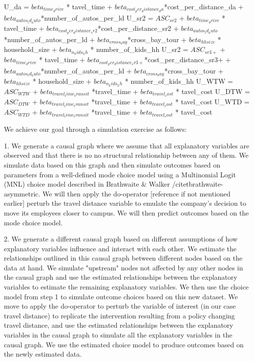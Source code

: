 U_da = $beta_{time_drive}$ * tavel_time + $beta_{cost_per_distance_da}$*cost_per_distance_da + $beta_{autos_ld_auto}$*number_of_autos_per_ld
U_sr2 = $ASC_{sr2}$ + $beta_{time_drive}$ * tavel_time + $beta_{cost_per_distance_sr2}$*cost_per_distance_sr2 + $beta_{autos_ld_auto}$*number_of_autos_per_ld + $beta_{cross_bay}$*cross_bay_tour + $beta_{hhsize}$ * household_size + $beta_{n_kids_hh}$ * number_of_kids_hh
U_sr2 = $ASC_{sr3+}$ + $beta_{time_drive}$ * tavel_time + $beta_{cost_per_distance_sr3+}$*cost_per_distance_sr3+ + $beta_{autos_ld_auto}$*number_of_autos_per_ld + $beta_{cross_bay}$*cross_bay_tour + $beta_{hhsize}$ * household_size + $beta_{n_kids_hh}$ * number_of_kids_hh
U_WTW = $ASC_{WTW}$ + $beta_{travel_time_transit}$ *travel_time + $beta_{travel_cost}$ * tavel_cost
U_DTW = $ASC_{DTW}$ + $beta_{travel_time_transit}$ *travel_time + $beta_{travel_cost}$ * tavel_cost
U_WTD = $ASC_{WTD}$ + $beta_{travel_time_transit}$ *travel_time + $beta_{travel_cost}$ * tavel_cost

We achieve our goal through a simulation exercise as follows:

1. We generate a causal graph where we assume that all explanatory variables are observed and that there 
is no no structural relationship between any of them. 
We simulate data based on this graph and then simulate outcomes based on parameters from a well-defined 
mode choice model using a Multinomial Logit (MNL) choice model described in Brathwaite & Walker /citet{brathwaite-asymmetric}.
We will then apply the do-operator [reference if not mentioned earlier] perturb the travel distance 
variable to emulate the company's decision to move its employees closer to campus.
We will then predict outcomes based on the mode choice model.

2. We generate a different causal graph based on different assumptions of how explanatory variables influence and interact with each other.
We estimate the relationships outlined in this causal graph between different nodes based on the data at hand.
We simulate "upstream" nodes not affected by any other nodes in the causal graph and use the estimated relationships 
between the explanatory variables to estimate the remaining explanatory variables.
We then use the choice model from step 1 to simulate outcome choices based on this new dataset.
We move to apply the do-operator to perturb the variable of interest (in our case travel distance) to replicate the intervention 
resulting from a policy changing travel distance, and use the estimated relationships between the explanatory 
variables in the causal graph to simulate all the explanatory variables in the causal graph.
We use the estimated choice model to produce outcomes based on the newly estimated data. 


